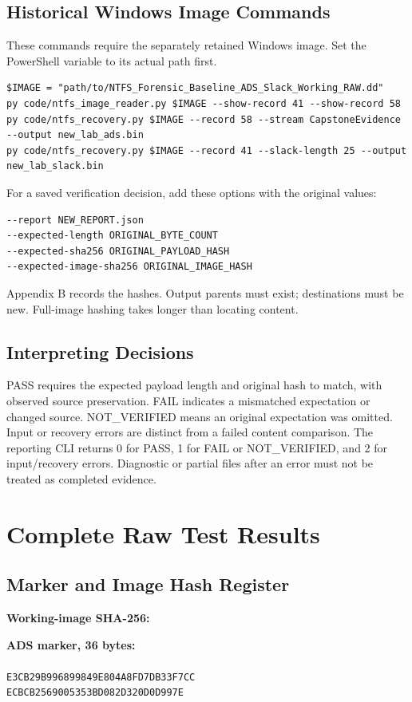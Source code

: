 \section{Historical Windows Image Commands}
These commands require the separately retained Windows image. Set the
PowerShell variable to its actual path first.
\begin{lstlisting}
$IMAGE = "path/to/NTFS_Forensic_Baseline_ADS_Slack_Working_RAW.dd"
py code/ntfs_image_reader.py $IMAGE --show-record 41 --show-record 58
py code/ntfs_recovery.py $IMAGE --record 58 --stream CapstoneEvidence --output new_lab_ads.bin
py code/ntfs_recovery.py $IMAGE --record 41 --slack-length 25 --output new_lab_slack.bin
\end{lstlisting}
For a saved verification decision, add these options with the original values:
\begin{lstlisting}
--report NEW_REPORT.json
--expected-length ORIGINAL_BYTE_COUNT
--expected-sha256 ORIGINAL_PAYLOAD_HASH
--expected-image-sha256 ORIGINAL_IMAGE_HASH
\end{lstlisting}
Appendix B records the hashes. Output parents must exist; destinations must
be new. Full-image hashing takes longer than locating content.

\section{Interpreting Decisions}
PASS requires the expected payload length and original hash to match, with
observed source preservation. FAIL indicates a mismatched expectation or
changed source. NOT\_VERIFIED means an original expectation was omitted.
Input or recovery errors are distinct from a failed content comparison.
The reporting CLI returns 0 for PASS, 1 for FAIL or NOT\_VERIFIED, and 2 for
input/recovery errors. Diagnostic or partial files after an error must not
be treated as completed evidence.

\chapter{Complete Raw Test Results}
\section{Marker and Image Hash Register}
\noindent\textbf{Working-image SHA-256:}\\
\workinghash

\medskip\noindent\textbf{ADS marker, 36 bytes:}\\
\\
\texttt{E3CB29B996899849E804A8FD7DB33F7CC}\\
\texttt{ECBCB2569005353BD082D320D0D997E}

